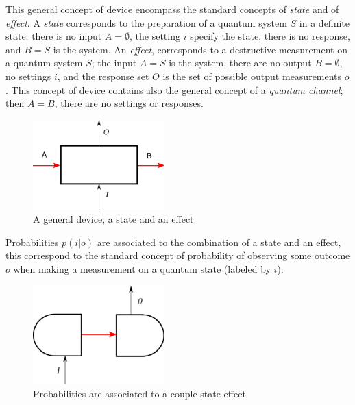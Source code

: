 This general concept of device encompass the standard concepts of \emph{state} and of \emph{effect}.
A \emph{state} corresponds to the preparation of a quantum system $S$ in a definite state; there is no input $A=\emptyset$, the setting $i$ specify the state, there is no response, and  $B=S$ is the system.
An \emph{effect}, corresponds to a destructive measurement on a quantum system $S$;  the input $A=S$ is the system, there are no output $B=\emptyset$, no settings $i$, and the response set $O$ is the set of possible output measurements $o$.
This concept of device contains also the general concept of a \emph{quantum channel};  then $A=B$, there are no settings or responses.
\begin{figure}[h]
\begin{center}
\includegraphics[width=2in]{quantum-test.pdf}
\qquad
{}
\qquad
{}
\caption{A general device, a state and an effect }
\label{fdevice}
\end{center}
\end{figure}
Probabilities $p(i | o)$  are associated to the combination of a state and an effect, this correspond to the standard concept of probability of observing some outcome $o$ when making a measurement on a quantum state (labeled by $i$).
\begin{figure}[h]
\begin{center}
\includegraphics[width=2in]{quantum-proba.pdf}
\caption{ Probabilities are associated to a couple state-effect}
\label{ }
\end{center}
\end{figure}

